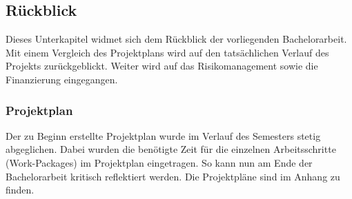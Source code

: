 \subsection{Rückblick}
Dieses Unterkapitel widmet sich dem Rückblick der vorliegenden Bachelorarbeit. Mit einem Vergleich des Projektplans wird auf den tatsächlichen Verlauf des Projekts zurückgeblickt. Weiter wird auf das Risikomanagement sowie die Finanzierung eingegangen.
\subsubsection{Projektplan}
\label{projektplan}
Der zu Beginn erstellte Projektplan wurde im Verlauf des Semesters stetig abgeglichen. Dabei wurden die benötigte Zeit für die einzelnen Arbeitsschritte (Work-Packages) im Projektplan eingetragen. So kann nun am Ende der Bachelorarbeit kritisch reflektiert werden. Die Projektpläne sind im Anhang zu finden.
\newline

